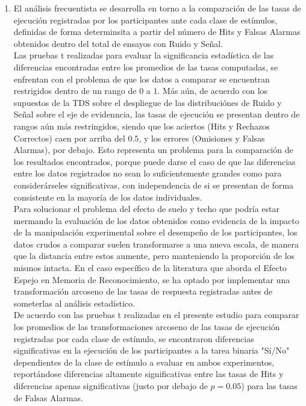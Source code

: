 \begin{enumerate}
\item El análisis frecuentista se desarrolla en torno a la comparación de las tasas de ejecución registradas por los participantes ante cada clase de estímulos, definidas de forma determinsita a partir del número de Hits y Falsas Alarmas obtenidos dentro del total de ensayos con Ruido y Señal.\\

Las pruebas t realizadas para evaluar la significancia estadística de las diferencias encontradas entre los promedios de las tasas computadas, se enfrentan con el problema de que los datos a comparar se encuentran restrigidos dentro de un rango de $0$ a $1$. Más aún, de acuerdo con los supuestos de la TDS sobre el despliegue de las distribuciónes de Ruido y Señal sobre el eje de evidenncia, las tasas de ejecución se presentan dentro de rangos aún más restringidos, siendo que los aciertos (Hits y Rechazos Correctos) caen por arriba del $0.5$, y los errores (Omisiones y Falsas Alarmas), por debajo. Esto representa un problema para la comparación de los resultados encontrados, porque puede darse el caso de que las diferencias entre los datos registrados no sean lo suficientemente grandes como para considerárseles significativas, con independencia de si se presentan de forma consistente en la mayoría de los datos individuales.\\

Para solucionar el problema del efecto de suelo y techo que podría estar mermando la evaluación de los datos obtenidos como evidencia de la impacto de la manipulación experimental sobre el desempeño de los participantes, los datos crudos a comparar suelen transformarse a una nueva escala, de manera que la distancia entre estos aumente, pero manteniendo la proporción de los mismos intacta. En el caso específico de la literatura que aborda el Efecto Espejo en Memoria de Reconocimiento, se ha optado por implementar una transformación arcoseno de las tasas de respuesta registradas antes de someterlas al análisis estadístico.\\

De acuerdo con las pruebas t realizadas en el presente estudio para comparar los promedios de las transformaciones arcoseno de las tasas de ejecución registradas por cada clase de estímulo, se encontraron diferencias significativas en la ejecución de los participantes a la tarea binaria "Sí/No" dependientes de la clase de estímulo a evaluar en ambos experimentos, reportándose diferencias altamente significativas entre las tasas de Hits y diferencias apenas significativas (justo por debajo de $p=0.05$) para las tasas de Falsas Alarmas.\\


\end{enumerate}
